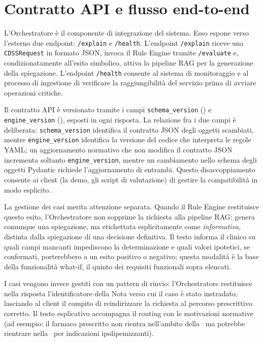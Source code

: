 \section{Contratto API e flusso end-to-end}
\label{sec:orchestrazione}

L'Orchestratore è il componente di integrazione del sistema.
Esso espone verso l'esterno due endpoint: \texttt{/explain} e \texttt{/health}.
L'endpoint \texttt{/explain} riceve una \texttt{CDSSRequest} in formato JSON,
invoca il Rule Engine tramite \texttt{/evaluate} e, condizionatamente
all'esito simbolico, attiva la pipeline RAG per la generazione della
spiegazione.
L'endpoint \texttt{/health} consente al sistema di monitoraggio e al
processo di ingestione di verificare la raggiungibilità del servizio
prima di avviare operazioni critiche.

\begin{sloppypar}
Il contratto API è versionato tramite i campi \texttt{schema\_version}
(\schemaversion) e \texttt{engine\_version} (\engineversion), esposti
in ogni risposta.
La relazione fra i due campi è deliberata: \texttt{schema\_version}
identifica il contratto JSON degli oggetti scambiati, mentre
\texttt{engine\_version} identifica la versione del codice che interpreta
le regole YAML; un aggiornamento normativo che non modifica il contratto
JSON incrementa soltanto \texttt{engine\_version}, mentre un cambiamento
nello schema degli oggetti Pydantic richiede l'aggiornamento di entrambi.
Questo disaccoppiamento consente ai client (la demo, gli script di valutazione)
di gestire la compatibilità in modo esplicito.
\end{sloppypar}

La gestione dei casi  merita attenzione separata.
Quando il Rule Engine restituisce questo esito, l'Orchestratore non sopprime
la richiesta alla pipeline RAG: genera comunque una spiegazione, ma
etichettata esplicitamente come \emph{informativa}, distinta dalla spiegazione
di una decisione definitiva.
Il testo informa il clinico su quali campi mancanti impediscono la
determinazione e quali valori ipotetici, se confermati, porterebbero
a un esito positivo o negativo; questa modalità è la base della funzionalità
what-if, il quinto dei requisiti funzionali sopra elencati.

I casi  vengono invece gestiti con un pattern di rinvio:
l'Orchestratore restituisce nella risposta l'identificatore della Nota
verso cui il caso è stato instradato, lasciando al client il compito
di reindirizzare la richiesta al percorso prescrittivo corretto.
Il testo esplicativo accompagna il routing con le motivazioni normative
(ad esempio: il farmaco prescritto non rientra nell'ambito della \notezero\
ma potrebbe rientrare nella \notetredici\ per indicazioni ipolipemizzanti).

